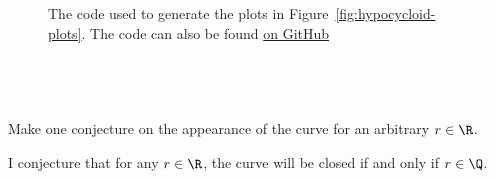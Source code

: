 \documentclass[a4paper]{article}
\begin{document}
\begin{figure}[hbtp]
    \centering
    \inputminted{python}{./code/generate_plots.py}
    \caption{The code used to generate the plots in Figure~\ref{fig:hypocycloid-plots}. The code can also be found \href{https://github.com/DoctorDalek1963/uni/blob/fe244f6880c7df0d801d426ca7ef9149b585ec2f/first-year/MA144-Methods-of-Mathematical-Modelling-2/Ass 1/code/generate_plots.py}{on GitHub}}
\end{figure}

\subsection{~} %

\begin{questionbody}
Make one conjecture on the appearance of the curve for an arbitrary $r \in \R$.
\end{questionbody}

I conjecture that for any $r \in \R$, the curve will be closed if and only if $r \in \Q$.
\end{document}
